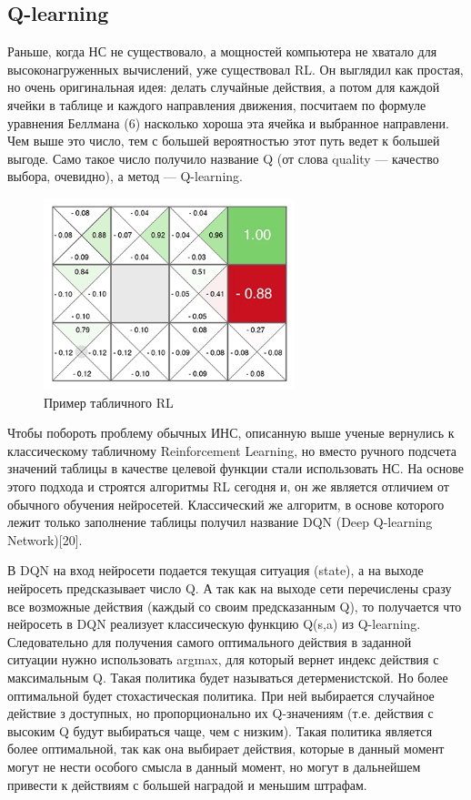 \documentclass[bachelor, och, coursework]{shiza}
\begin{document}
\subsection{Q-learning}
Раньше, когда НС не существовало, а мощностей компьютера не хватало для высоконагруженных вычислений, уже существовал RL. Он выглядил как простая, но очень оригинальная идея:
делать случайные действия, а потом для каждой ячейки в таблице и каждого направления движения, посчитаем по формуле уравнения Беллмана (6) насколько хороша эта ячейка и выбранное направлени. Чем
выше это число, тем с большей вероятностью этот путь ведет к большей выгоде. Само такое число получило название Q (от слова quality — качество выбора, очевидно), а метод —
Q-learning.
\begin{figure}[H]
    \centering
    \includegraphics[width=0.65\textwidth]{pic/8}
    \caption{Пример табличного RL}
    \label{fig:img1}
\end{figure}
Чтобы побороть проблему обычных ИНС, описанную выше ученые вернулись к классическому табличному Reinforcement Learning, но вместо ручного подсчета значений таблицы в качестве
целевой функции стали использовать НС. На основе этого подхода и строятся алгоритмы RL сегодня и, он же является отличием от обычного обучения нейросетей. Классический же
алгоритм, в основе которого лежит только заполнение таблицы получил название DQN (Deep Q-learning Network)[20].

В DQN на вход нейросети подается текущая ситуация (state), а на выходе нейросеть предсказывает число Q. А так как на выходе сети перечислены сразу все возможные действия
(каждый со своим предсказанным Q), то получается что нейросеть в DQN реализует классическую функцию Q(s,a) из Q-learning. Следовательно для получения самого оптимального
действия в заданной ситуации нужно использовать argmax, для который вернет индекс действия с максимальным Q. Такая политика будет называться детерменистской. Но более
оптимальной будет стохастическая политика. При ней выбирается случайное действие з доступных, но пропорционально их Q-значениям (т.е. действия с высоким Q будут выбираться
чаще, чем с низким). Такая политика является более оптимальной, так как она выбирает действия, которые в данный момент могут не нести особого смысла в данный момент, но могут
в дальнейшем привести к действиям с большей наградой и меньшим штрафам.
\end{document}
